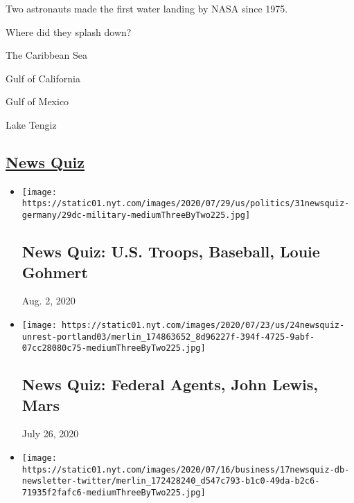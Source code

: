 Two astronauts made the first water landing by NASA since 1975.

Where did they splash down?

The Caribbean Sea

Gulf of California

Gulf of Mexico

Lake Tengiz

\hypertarget{news-quiz}{%
\subsection{\texorpdfstring{\href{https://www.nytimes.com/spotlight/news-quiz}{News
Quiz}}{News Quiz}}\label{news-quiz}}

\begin{itemize}
\item
  \href{https://www.nytimes.com/interactive/2020/07/31/briefing/troops-baseball-louie-gohmert-news-quiz.html}{}

  \texttt{[image: https://static01.nyt.com/images/2020/07/29/us/politics/31newsquiz-germany/29dc-military-mediumThreeByTwo225.jpg]}

  \hypertarget{news-quiz-us-troops-baseball-louie-gohmert}{%
  \subsection{News Quiz: U.S. Troops, Baseball, Louie
  Gohmert}\label{news-quiz-us-troops-baseball-louie-gohmert}}

  Aug. 2, 2020
\item
  \href{https://www.nytimes.com/interactive/2020/07/24/briefing/federal-agents-john-lewis-mars-news-quiz.html}{}

  \texttt{[image: https://static01.nyt.com/images/2020/07/23/us/24newsquiz-unrest-portland03/merlin\_174863652\_8d96227f-394f-4725-9abf-07cc28080c75-mediumThreeByTwo225.jpg]}

  \hypertarget{news-quiz-federal-agents-john-lewis-mars}{%
  \subsection{News Quiz: Federal Agents, John Lewis,
  Mars}\label{news-quiz-federal-agents-john-lewis-mars}}

  July 26, 2020
\item
  \href{https://www.nytimes.com/interactive/2020/07/17/briefing/china-twitter-disney-news-quiz.html}{}

  \texttt{[image: https://static01.nyt.com/images/2020/07/16/business/17newsquiz-db-newsletter-twitter/merlin\_172428240\_d547c793-b1c0-49da-b2c6-71935f2fafc6-mediumThreeByTwo225.jpg]}


\end{itemize}

